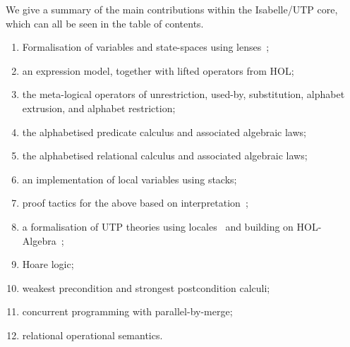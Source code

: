 \documentclass[11pt,a4paper]{article}
\begin{document}
We give a summary of the main contributions within the Isabelle/UTP core, which can all be seen in the table of
contents.

\begin{enumerate}
  \item Formalisation of variables and state-spaces using lenses~\cite{Foster16a};
  \item an expression model, together with lifted operators from HOL;
  \item the meta-logical operators of unrestriction, used-by, substitution, alphabet extrusion, and alphabet restriction;
  \item the alphabetised predicate calculus and associated algebraic laws;
  \item the alphabetised relational calculus and associated algebraic laws;
  \item an implementation of local variables using stacks;
  \item proof tactics for the above based on interpretation~\cite{Huffman13};
  \item a formalisation of UTP theories using locales~\cite{Ballarin06} and building on HOL-Algebra~\cite{Ballarin17};
  \item Hoare logic;
  \item weakest precondition and strongest postcondition calculi;
  \item concurrent programming with parallel-by-merge;
  \item relational operational semantics.
\end{enumerate}





\end{document}
